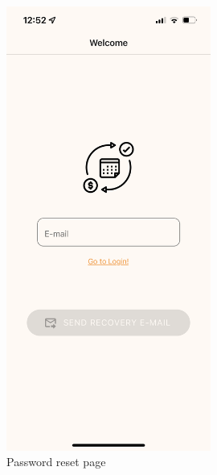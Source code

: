 \documentclass[12pt]{article}
\begin{document}
\begin{figure}[h!]
\begin{minipage}[c]{0.45\textwidth}
        \includegraphics[width=0.6\textwidth, clip]{../../assets/smartphone/forgot.PNG}
        \caption{Password reset page}
        \label{fig:forgot}
    \end{minipage}
\end{figure}
\end{document}
